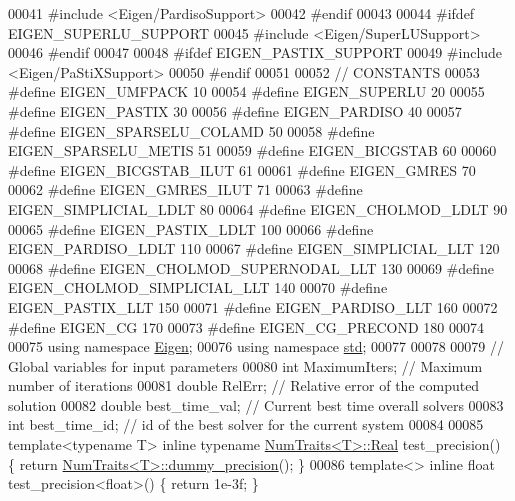 \begin{DoxyCode}
00041 \textcolor{preprocessor}{#include <Eigen/PardisoSupport>}
00042 \textcolor{preprocessor}{#endif}
00043 
00044 \textcolor{preprocessor}{#ifdef EIGEN\_SUPERLU\_SUPPORT}
00045 \textcolor{preprocessor}{#include <Eigen/SuperLUSupport>}
00046 \textcolor{preprocessor}{#endif}
00047 
00048 \textcolor{preprocessor}{#ifdef EIGEN\_PASTIX\_SUPPORT}
00049 \textcolor{preprocessor}{#include <Eigen/PaStiXSupport>}
00050 \textcolor{preprocessor}{#endif}
00051 
00052 \textcolor{comment}{// CONSTANTS}
00053 \textcolor{preprocessor}{#define EIGEN\_UMFPACK  10}
00054 \textcolor{preprocessor}{#define EIGEN\_SUPERLU  20}
00055 \textcolor{preprocessor}{#define EIGEN\_PASTIX  30}
00056 \textcolor{preprocessor}{#define EIGEN\_PARDISO  40}
00057 \textcolor{preprocessor}{#define EIGEN\_SPARSELU\_COLAMD 50}
00058 \textcolor{preprocessor}{#define EIGEN\_SPARSELU\_METIS 51}
00059 \textcolor{preprocessor}{#define EIGEN\_BICGSTAB  60}
00060 \textcolor{preprocessor}{#define EIGEN\_BICGSTAB\_ILUT  61}
00061 \textcolor{preprocessor}{#define EIGEN\_GMRES 70}
00062 \textcolor{preprocessor}{#define EIGEN\_GMRES\_ILUT 71}
00063 \textcolor{preprocessor}{#define EIGEN\_SIMPLICIAL\_LDLT  80}
00064 \textcolor{preprocessor}{#define EIGEN\_CHOLMOD\_LDLT  90}
00065 \textcolor{preprocessor}{#define EIGEN\_PASTIX\_LDLT  100}
00066 \textcolor{preprocessor}{#define EIGEN\_PARDISO\_LDLT  110}
00067 \textcolor{preprocessor}{#define EIGEN\_SIMPLICIAL\_LLT  120}
00068 \textcolor{preprocessor}{#define EIGEN\_CHOLMOD\_SUPERNODAL\_LLT  130}
00069 \textcolor{preprocessor}{#define EIGEN\_CHOLMOD\_SIMPLICIAL\_LLT  140}
00070 \textcolor{preprocessor}{#define EIGEN\_PASTIX\_LLT  150}
00071 \textcolor{preprocessor}{#define EIGEN\_PARDISO\_LLT  160}
00072 \textcolor{preprocessor}{#define EIGEN\_CG  170}
00073 \textcolor{preprocessor}{#define EIGEN\_CG\_PRECOND  180}
00074 
00075 \textcolor{keyword}{using namespace }\hyperlink{namespace_eigen}{Eigen};
00076 \textcolor{keyword}{using namespace }\hyperlink{namespacestd}{std}; 
00077 
00078 
00079 \textcolor{comment}{// Global variables for input parameters}
00080 \textcolor{keywordtype}{int} MaximumIters; \textcolor{comment}{// Maximum number of iterations}
00081 \textcolor{keywordtype}{double} RelErr; \textcolor{comment}{// Relative error of the computed solution}
00082 \textcolor{keywordtype}{double} best\_time\_val; \textcolor{comment}{// Current best time overall solvers }
00083 \textcolor{keywordtype}{int} best\_time\_id; \textcolor{comment}{//  id of the best solver for the current system }
00084 
00085 \textcolor{keyword}{template}<\textcolor{keyword}{typename} T> \textcolor{keyword}{inline} \textcolor{keyword}{typename} \hyperlink{group___core___module_struct_eigen_1_1_num_traits}{NumTraits<T>::Real} test\_precision() \{ \textcolor{keywordflow}{return} 
      \hyperlink{group___core___module_struct_eigen_1_1_num_traits}{NumTraits<T>::dummy\_precision}(); \}
00086 \textcolor{keyword}{template}<> \textcolor{keyword}{inline} \textcolor{keywordtype}{float} test\_precision<float>() \{ \textcolor{keywordflow}{return} 1e-3f; \}                                          
                         

\end{DoxyCode}
